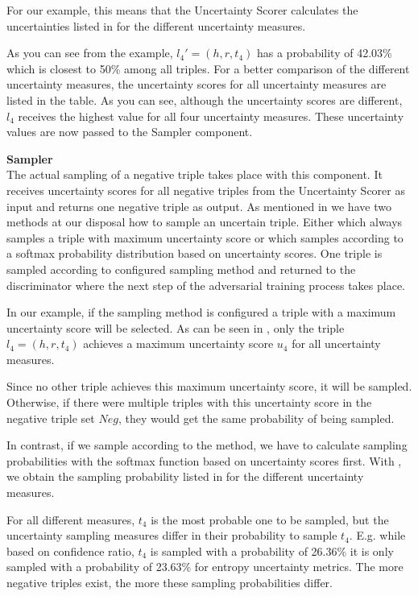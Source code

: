 For our example, this means that the Uncertainty Scorer calculates the uncertainties listed in  for the different uncertainty measures.

As you can see from the example, $l_4' = (h, r, t_4)$ has a probability of 42.03\% which is closest to 50\% among all triples.
For a better comparison of the different uncertainty measures, the uncertainty scores for all uncertainty measures are listed in the table.
As you can see, although the uncertainty scores are different, $l_4$ receives the highest value for all four uncertainty measures.
These uncertainty values are now passed to the Sampler component.

\textbf{Sampler} \\
The actual sampling of a negative triple takes place with this component.
It receives uncertainty scores for all negative triples from the Uncertainty Scorer as input and returns one negative triple as output.
As mentioned in  we have two methods at our disposal how to sample an uncertain triple.
Either \usmax which always samples a triple with maximum uncertainty score or \ussoftmax which samples according to a softmax probability distribution based on uncertainty scores.
One triple is sampled according to configured sampling method and returned to the discriminator where the next step of the adversarial training process takes place.

In our example, if the \usmax sampling method is configured a triple with a maximum uncertainty score will be selected.
As can be seen in , only the triple $l_4 = (h,r,t_4)$ achieves a maximum uncertainty score $u_4$ for all uncertainty measures.

Since no other triple achieves this maximum uncertainty score, it will be sampled.
Otherwise, if there were multiple triples with this uncertainty score in the negative triple set $Neg$, they would get the same probability of being sampled.

In contrast, if we sample according to the \ussoftmax method, we have to calculate sampling probabilities with the softmax function based on uncertainty scores first.
With , we obtain the sampling probability listed in  for the different uncertainty measures.

For all different measures, $t_4$ is the most probable one to be sampled, but the uncertainty sampling measures differ in their probability to sample $t_4$.
E.g. while based on confidence ratio, $t_4$ is sampled with a probability of 26.36\% it is only sampled with a probability of 23.63\% for entropy uncertainty metrics.
The more negative triples exist, the more these sampling probabilities differ.

